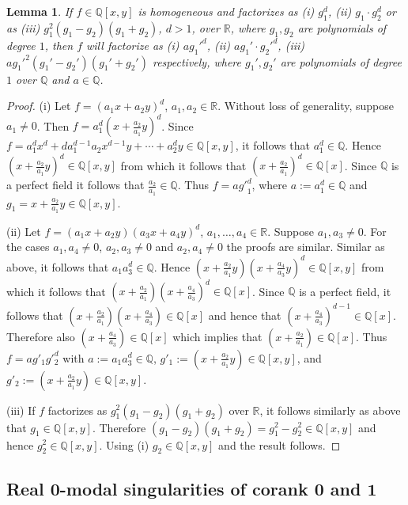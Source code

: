 \documentclass[noend]{amsproc}
\newtheorem{lemma}[theorem]{Lemma}
\theoremstyle{definition}
\begin{document}
\begin{lemma}\label{x^3}
If $f\in\mathbb Q[x,y]$ is homogeneous and factorizes as (i) $g_1^d$, (ii)
$g_1\cdot g_2^{d}$ or as  (iii) $g_1^2(g_1-g_2)(g_1+g_2)$, $d>1$, over
$\mathbb
R$, where $g_1,g_2$ are polynomials of degree $1$, then $f$ will factorize as
(i) $ag_1'^d$, (ii) $ag_1'\cdot g_2'^d$, (iii) $ag_1'^2(g_1'-g_2')(g_1'+g_2')$
respectively,
where $g_1', g_2'$ are polynomials of degree $1$ over $\mathbb Q$ and
$a\in\mathbb Q$.
\end{lemma}
\begin{proof}

(i) Let $f=(a_1x+a_2y)^d$, $a_1,a_2\in\mathbb R$. Without loss of generality,
suppose $a_1\neq 0$. Then $f=a_1^d(x+\frac{a_2}{a_1}y)^d$. Since $f=
a_1^dx^d+da_1^{d-1}a_2x^{d-1}y+\cdots+a_2^dy\in\mathbb Q[x,y]$, it follows
that $a_1^d\in\mathbb Q$. Hence $(x+\frac{a_2}{a_1}y)^d\in\mathbb Q[x,y]$
from which it follows that $(x+\frac{a_2}{a_1})^d\in\mathbb Q[x]$. Since
$\mathbb Q$ is a perfect field it follows that $\frac{a_2}{a_1}\in\mathbb
Q$. Thus $f=a{g'}_1^d$, where $a:=a_1^d\in\mathbb Q$ and
$g_1=x+\frac{a_2}{a_1}y\in\mathbb Q[x,y]$.

(ii) Let $f=(a_1x+a_2y)(a_3x+a_4y)^{d}$, $a_1,\ldots,a_4\in\mathbb
R$. Suppose $a_1,a_3\neq 0$.
For the cases $a_1,a_4\neq 0$, $a_2,a_3\neq 0$ and $a_2,a_4\neq 0$ the
proofs are similar.
Similar as above, it follows that $a_1a_3^{d}\in\mathbb Q$. Hence
$(x+\frac{a_2}{a_1}y)(x+\frac{a_4}{a_3}y)^d\in\mathbb Q[x,y]$ from which
it follows that $(x+\frac{a_2}{a_1})(x+\frac{a_4}{a_3})^d\in\mathbb
Q[x]$. Since $\mathbb Q$ is a perfect field, it follows that
$(x+\frac{a_2}{a_1})(x+\frac{a_4}{a_3})\in\mathbb Q[x]$ and
hence that $(x+\frac{a_4}{a_3})^{d-1}\in\mathbb Q[x]$. Therefore
also $(x+\frac{a_4}{a_3})\in\mathbb Q[x]$ which implies that
$(x+\frac{a_2}{a_1})\in\mathbb Q[x]$.
Thus $f=ag'_1g'^d_2$ with $a:=a_1a_3^d\in\mathbb Q$,
$g'_1:=(x+\frac{a_2}{a_1}y)\in\mathbb Q[x,y]$, and
$g'_2:=(x+\frac{a_2}{a_1}y)\in\mathbb Q[x,y]$.

(iii) If $f$ factorizes as $g_1^2(g_1-g_2)(g_1+g_2)$ over $\mathbb R$, it
follows similarly as above that $g_1\in\mathbb Q[x,y]$. Therefore
$(g_1-g_2)(g_1+g_2)=g_1^2-g_2^2\in\mathbb Q[x,y]$ and hence $g_2^2\in\mathbb
Q[x,y]$. Using (i) $g_2\in\mathbb Q[x,y]$ and the result follows.
\end{proof}

\subsection{Real $\mathbf{0}$-modal singularities of corank $\mathbf{0}$ and
$\mathbf{1}$}%
\label{RealSingularitiesOfZeroModality}
\end{document}
